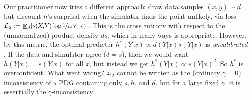 \documentclass[twoside]{article}
\makeatletter
\theoremstyle{plain}
\theoremstyle{definition}
\DeclareMathOperator*{\Ex}{\mathbb{E}} %
\newcommand{\balpha}{\boldsymbol\alpha}
\newcommand{\dg}[1]{\mathbdcal{#1}}
\newcommand\aar{\@ifstar\aar@one@star\aar@plain}
\newcommand\aar@one@star{\@ifstar\aar@resize{\aar@plain*}}
\newcommand\aar@resize[1]{\sbox{\aar@content}{#1}\scaleleftright[3.8ex]
			{\Biggl\langle\!\!\!\!\Biggl\langle}{\usebox{\aar@content}}
			{\Biggr\rangle\!\!\!\!\Biggr\rangle}}
\makeatother
\begin{document}
Our practitioner now tries a different approach: draw data samples $(x,y) \sim d$ but discount $h$'s surprisal when the simulator finds the point unlikely, via loss $\mathcal L_2 := \Ex_{d} [s(\mkern-2muX\!,\!Y\mkern-2mu) \log \nf1{h(Y|X)}]$.
This is the cross entropy with respect to the (unnormalized) product density $ds$, which in many ways is appropriate.
However, by this metric, the optimal predictor $h^*(Y|x) \propto d(Y|x) s(Y|x)$ is
\emph{uncalibrated} \parencite{dawid1982well}.
If the data and simulator agree ($d \!=\! s$), then we would want $h(Y|x) \!=\! s(Y|x)$ for all $x$, but instead we get $h^*(Y|x) \propto s(Y|x)^2$.
So $h^*$ is overconfident.
What went wrong?
$\mathcal L_2$ cannot be written as the (ordinary $\gamma\!=\!0$) inconsistency
of a PDG containing only $s,h$, and $d$,
but for a large fixed $\gamma$, it is essentially the $\gamma$-inconsistency
\end{document}

